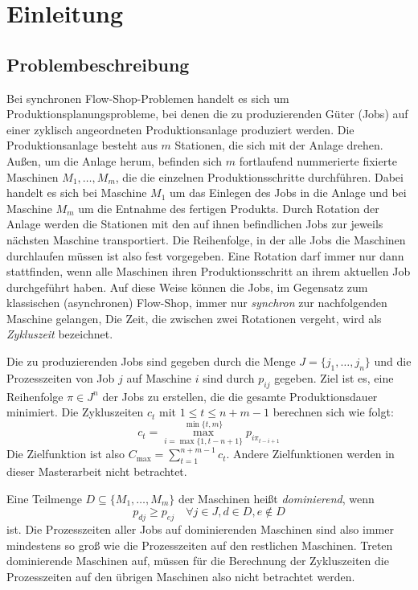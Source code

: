 \documentclass{scrreprt}
\begin{document}
\tableofcontents

\chapter{Einleitung}
\section{Problembeschreibung}
Bei synchronen Flow-Shop-Problemen handelt es sich um Produktions\-planungs\-probleme,
bei denen die zu produzierenden Güter (Jobs) auf einer zyklisch angeordneten Produktionsanlage
produziert werden. Die Produktionsanlage be\-steht aus $m$ Stationen, die sich mit der Anlage drehen.
Außen, um die Anlage herum, befinden sich $m$ fortlaufend nummerierte fixierte Maschinen $M_1,\ldots,M_m$, die die einzelnen Produktionsschritte durchführen.
Dabei handelt es sich bei Maschine $M_1$ um das Einlegen des Jobs in die Anlage und bei Maschine $M_m$ um die Entnahme des fertigen Produkts.
Durch Rotation der Anlage werden die Stationen mit den auf ihnen befindlichen Jobs zur jeweils nächsten Maschine transportiert.
Die Reihenfolge, in der alle Jobs die Maschinen durchlaufen müssen ist also fest vorgegeben.
Eine Rotation darf immer nur dann stattfinden, wenn alle Maschinen ihren Produktionsschritt an ihrem aktuellen Job
durchgeführt haben. Auf diese Weise können die Jobs, im Gegensatz zum klassischen (asynchronen) Flow-Shop, 
immer nur \textit{synchron} zur nachfolgenden Maschine gelangen,
Die Zeit, die zwischen zwei Rotationen vergeht, wird als \textit{Zykluszeit} bezeichnet.

Die zu produzierenden Jobs sind gegeben durch die Menge $J=\{j_1,\ldots,j_n\}$ 
und die Prozesszeiten von Job $j$ auf Maschine $i$ sind durch $p_{ij}$ gegeben.
Ziel ist es, eine Reihenfolge $\pi\in J^n$ der Jobs zu erstellen, die die gesamte Produktionsdauer minimiert.
Die Zykluszeiten $c_t$ mit $1\leq t\leq n+m-1$ berechnen sich wie folgt:
\[ c_t = \max_{i=\max\{1,t-n+1\}}^{\min\{t,m\}} p_{i\pi_{t-i+1}} \]
Die Zielfunktion ist also $C_{\max} = \sum_{t=1}^{n+m-1} c_t$. 
Andere Zielfunktionen werden in dieser Masterarbeit nicht betrachtet.

Eine Teilmenge $D \subseteq \{M_1,\ldots,M_m\}$ der Maschinen heißt \textit{dominierend}, wenn 
\[ p_{dj} \geq p_{ej} \quad \forall j\in J, d\in D, e\not\in D \] 
ist. Die Prozesszeiten aller Jobs auf dominierenden Maschinen sind also immer mindestens so groß wie die Prozesszeiten auf den restlichen Maschinen.
Treten dominierende Maschinen auf, müssen für die Berechnung der Zykluszeiten die Prozesszeiten auf den übrigen Maschinen also nicht betrachtet werden.
\end{document}

